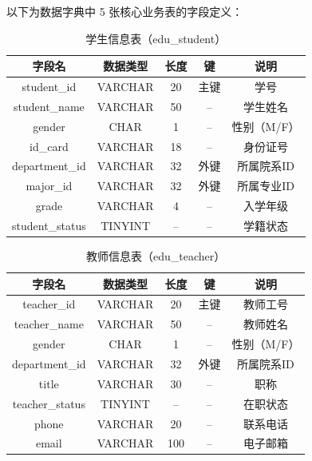 \documentclass[12pt, a4paper]{academics}
\begin{document}
以下为数据字典中 5 张核心业务表的字段定义：

\setlength{\belowcaptionskip}{8pt}
\begin{table}[h]
\centering
\caption{学生信息表（edu\_student）}
\begin{tabular}{|c|c|c|c|c|}
\hline
\textbf{字段名} & \textbf{数据类型} & \textbf{长度} & \textbf{键} & \textbf{说明} \\
\hline
student\_id & VARCHAR & 20 & 主键 & 学号 \\
student\_name & VARCHAR & 50 & -- & 学生姓名 \\
gender & CHAR & 1 & -- & 性别（M/F） \\
id\_card & VARCHAR & 18 & -- & 身份证号 \\
department\_id & VARCHAR & 32 & 外键 & 所属院系ID \\
major\_id & VARCHAR & 32 & 外键 & 所属专业ID \\
grade & VARCHAR & 4 & -- & 入学年级 \\
student\_status & TINYINT & -- & -- & 学籍状态 \\
\hline
\end{tabular}
\end{table}

\begin{table}[h]
\centering
\caption{教师信息表（edu\_teacher）}
\begin{tabular}{|c|c|c|c|c|}
\hline
\textbf{字段名} & \textbf{数据类型} & \textbf{长度} & \textbf{键} & \textbf{说明} \\
\hline
teacher\_id & VARCHAR & 20 & 主键 & 教师工号 \\
teacher\_name & VARCHAR & 50 & -- & 教师姓名 \\
gender & CHAR & 1 & -- & 性别（M/F） \\
department\_id & VARCHAR & 32 & 外键 & 所属院系ID \\
title & VARCHAR & 30 & -- & 职称 \\
teacher\_status & TINYINT & -- & -- & 在职状态 \\
phone & VARCHAR & 20 & -- & 联系电话 \\
email & VARCHAR & 100 & -- & 电子邮箱 \\
\hline
\end{tabular}
\end{table}
\end{document}
